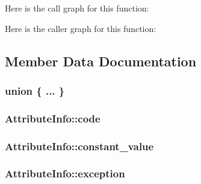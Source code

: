 Here is the call graph for this function\+:




Here is the caller graph for this function\+:




\subsection{Member Data Documentation}
\subsubsection[{\texorpdfstring{"@1}{@1}}]{\setlength{\rightskip}{0pt plus 5cm}union \{ ... \} }\hypertarget{class_attribute_info_ab35b46c1790d2b7441e934de8e718efb}{}\label{class_attribute_info_ab35b46c1790d2b7441e934de8e718efb}
\subsubsection[{\texorpdfstring{code}{code}}]{ Attribute\+Info\+::code}\hypertarget{class_attribute_info_a8402afa8032becfaf9feeb3ac48fd503}{}\label{class_attribute_info_a8402afa8032becfaf9feeb3ac48fd503}
\subsubsection[{\texorpdfstring{constant\+\_\+value}{constant_value}}]{ Attribute\+Info\+::constant\+\_\+value}\hypertarget{class_attribute_info_a250a7f39bbb2a2589dbf7bcdcf58639a}{}\label{class_attribute_info_a250a7f39bbb2a2589dbf7bcdcf58639a}
\subsubsection[{\texorpdfstring{exception}{exception}}]{ Attribute\+Info\+::exception}\hypertarget{class_attribute_info_a72e793558ac34051d73771f94591c089}{}\label{class_attribute_info_a72e793558ac34051d73771f94591c089}

